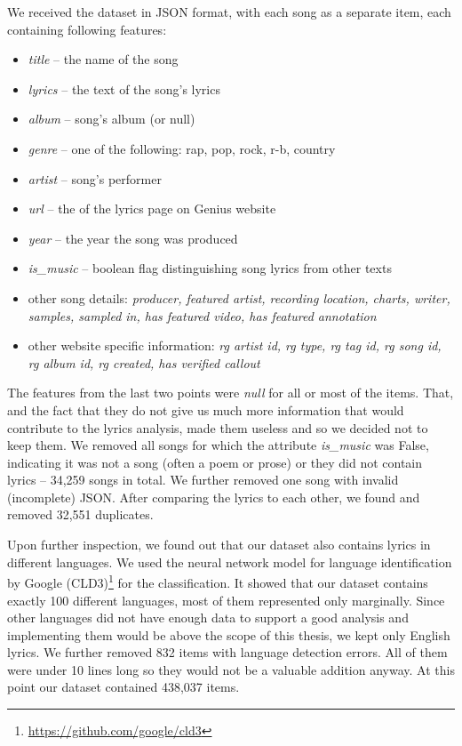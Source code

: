 We received the dataset in JSON format, with each song as a separate item, each containing  following features:

\begin{itemize}
	\item \textit{title} -- the name of the song
	\item \textit{lyrics} -- the text of the song's lyrics
	\item \textit{album} -- song's album (or null)
	\item \textit{genre} -- one of the following: rap, pop, rock, r-b, country
	\item \textit{artist} -- song's performer
	\item \textit{url} -- the  of the lyrics page on Genius website
	\item \textit{year} -- the year the song was produced
	\item \textit{is\_music} -- boolean flag distinguishing song lyrics from other texts
	\item other song details: \textit{producer, featured artist, recording location, charts, writer, samples, sampled in, has featured video, has featured annotation}
	\item other website specific information: \textit{rg artist id, rg type, rg tag id, rg song id, rg album id, rg created, has verified callout}	
\end{itemize}

The features from the last two points were \textit{null} for all or most of the items. That, and the fact that they do not give us much more information that would contribute to the lyrics analysis, made them useless and so we decided not to keep them. We removed all songs for which the attribute \textit{is\_music} was False, indicating it was not a song (often a poem or prose) or they did not contain lyrics -- 34,259 songs in total. We further removed one song with invalid (incomplete) JSON. After comparing the lyrics to each other, we found and removed 32,551 duplicates.

Upon further inspection, we found out that our dataset also contains lyrics in different languages. We used the neural network model for language identification by Google (CLD3)\footnote{\url{https://github.com/google/cld3}} for the classification. It showed that our dataset contains exactly 100 different languages, most of them represented only marginally. Since other languages did not have enough data to support a good analysis and implementing them would be above the scope of this thesis, we kept only English lyrics. We further removed 832 items with language detection errors. All of them were under 10 lines long so they would not be a valuable addition anyway. At this point our dataset contained 438,037 items.

